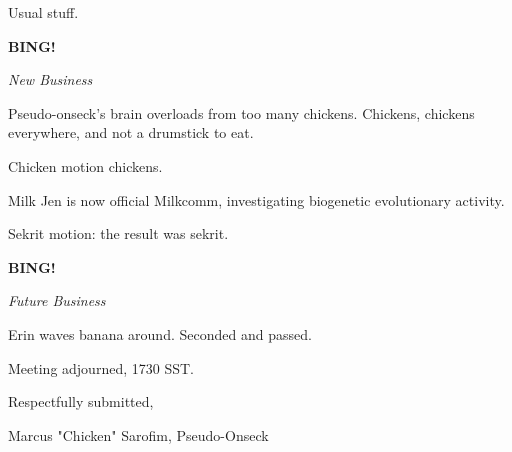 \documentclass[12pt]{article}
\newcommand{\bing}{{\bf BING!} }
\newcommand{\goto}[1]{\bing \vskip 12pt \centerline{{\em{#1}}}}
\begin{document}
Usual stuff.

\goto{New Business}

Pseudo-onseck's brain overloads from too many chickens. Chickens, chickens everywhere, and not a drumstick to eat.

Chicken motion chickens.

Milk Jen is now official Milkcomm, investigating biogenetic evolutionary activity.

Sekrit motion: the result was sekrit.

\goto{Future Business}

Erin waves banana around. Seconded and passed.

\vspace{12pt}

\noindent
Meeting adjourned, 1730 SST.

\vspace{18pt}

\centerline{Respectfully submitted,}
\centerline{Marcus "Chicken" Sarofim, Pseudo-Onseck}
\end{document}
